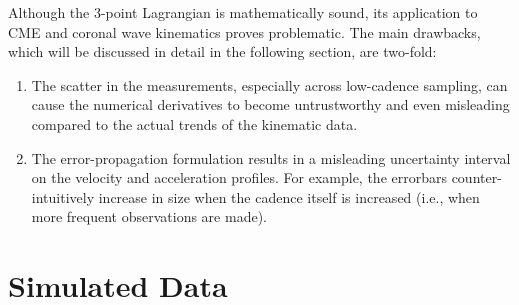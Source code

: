 \documentclass[structabstract]{aa}
\begin{document}
Although the 3-point Lagrangian is mathematically sound, its application to CME and coronal wave kinematics proves problematic. The main drawbacks, which will be discussed in detail in the following section, are two-fold:
\begin{enumerate}
\item The scatter in the measurements, especially across low-cadence sampling, can cause the numerical derivatives to become untrustworthy and even misleading compared to the actual trends of the kinematic data.
\item The error-propagation formulation results in a misleading uncertainty interval on the velocity and acceleration profiles. For example, the errorbars counter-intuitively increase in size when the cadence itself is increased (i.e., when more frequent observations are made).
\end{enumerate}




\section{Simulated Data}
\label{sect:simul1}
\end{document}
